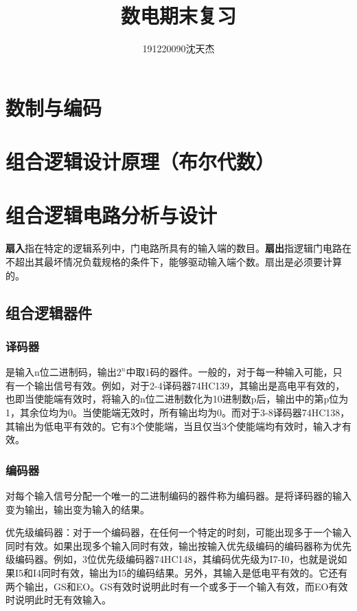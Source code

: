 \documentclass{article}
\title{数电期末复习}
\author{191220090沈天杰}
\begin{document}
	\maketitle
	\tableofcontents
	\newpage
	\section{数制与编码}
	\section{组合逻辑设计原理（布尔代数）}
	\section{组合逻辑电路分析与设计}
	\textbf{扇入}指在特定的逻辑系列中，门电路所具有的输入端的数目。\textbf{扇出}指逻辑门电路在不超出其最坏情况负载规格的条件下，能够驱动输入端个数。扇出是必须要计算的。
	\subsection{组合逻辑器件}
	\subsubsection{译码器}
	是输入n位二进制码，输出$2^n$中取1码的器件。一般的，对于每一种输入可能，只有一个输出信号有效。例如，对于2-4译码器74HC139，其输出是高电平有效的，也即当使能端有效时，将输入的n位二进制数化为10进制数p后，输出中的第p位为1，其余位均为0。当使能端无效时，所有输出均为0。而对于3-8译码器74HC138，其输出为低电平有效的。它有3个使能端，当且仅当3个使能端均有效时，输入才有效。
	\subsubsection{编码器}
	对每个输入信号分配一个唯一的二进制编码的器件称为编码器。是将译码器的输入变为输出，输出变为输入的结果。\par
	优先级编码器：对于一个编码器，在任何一个特定的时刻，可能出现多于一个输入同时有效。如果出现多个输入同时有效，输出按输入优先级编码的编码器称为优先级编码器。例如，3位优先级编码器74HC148，其编码优先级为I7-I0，也就是说如果I5和I4同时有效，输出为I5的编码结果。另外，其输入是低电平有效的。它还有两个输出，GS和EO。GS有效时说明此时有一个或多于一个输入有效，而EO有效时说明此时无有效输入。
\end{document}
